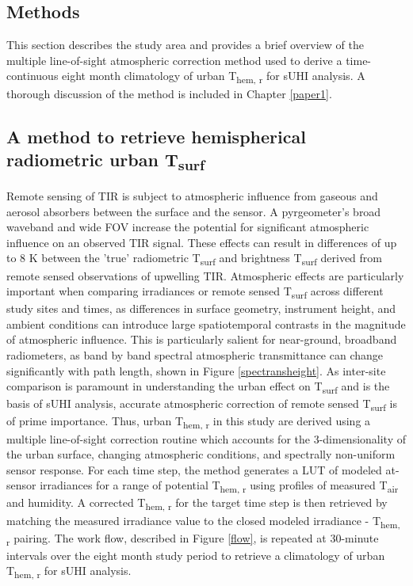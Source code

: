 \begin{bibunit}
\section{Methods}

This section describes the study area and provides a brief overview of the multiple line-of-sight atmospheric correction method used to derive a time-continuous eight month climatology of urban T\textsubscript{hem, r} for sUHI analysis. A thorough discussion of the method is included in Chapter \ref{paper1}.

\subsection{A method to retrieve hemispherical radiometric urban T\textsubscript{surf}}
\label{method2}

Remote sensing of TIR is subject to atmospheric influence from gaseous and aerosol absorbers between the surface and the sensor. A pyrgeometer's broad waveband and wide FOV increase the potential for significant atmospheric influence on an observed TIR signal. These effects can result in differences of up to 8 \si{\kelvin} between the 'true' radiometric T\textsubscript{surf} and brightness T\textsubscript{surf} derived from remote sensed observations of upwelling TIR. Atmospheric effects are particularly important when comparing irradiances or remote sensed T\textsubscript{surf} across different study sites and times, as differences in surface geometry, instrument height, and ambient conditions can introduce large spatiotemporal contrasts in the magnitude of atmospheric influence. This is particularly salient for near-ground, broadband radiometers, as band by band spectral atmospheric transmittance can change significantly with path length, shown in Figure \ref{spectransheight}. As inter-site comparison is paramount in understanding the urban effect on T\textsubscript{surf} and is the basis of sUHI analysis, accurate atmospheric correction of remote sensed T\textsubscript{surf} is of prime importance. Thus, urban T\textsubscript{hem, r} in this study are derived using a multiple line-of-sight correction routine which accounts for the 3-dimensionality of the urban surface, changing atmospheric conditions, and spectrally non-uniform sensor response. For each time step, the method generates a LUT of modeled at-sensor irradiances for a range of potential T\textsubscript{hem, r} using profiles of measured T\textsubscript{air} and humidity. A corrected T\textsubscript{hem, r} for the target time step is then retrieved by matching the measured irradiance value to the closed modeled irradiance - T\textsubscript{hem, r} pairing. The work flow, described in Figure \ref{flow}, is repeated at 30-minute intervals over the eight month study period to retrieve a climatology of urban T\textsubscript{hem, r} for sUHI analysis.


\end{bibunit}
